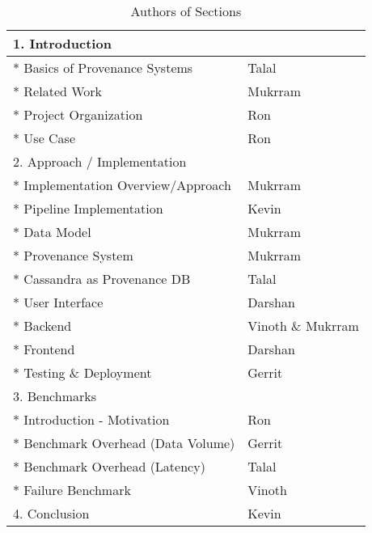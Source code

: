 \begin{table}
\begin{center}
 \begin{tabular}{| m{18em} m{10em} |} 
 \hline
1. Introduction                                                   &                    \\
 \hline
* Basics of Provenance Systems                                    &     Talal               \\
 \hline
* Related Work                                                    &          Mukrram          \\
 \hline
* Project Organization                                            &         Ron           \\
 \hline
* Use Case                                                        &   Ron                 \\
 \hline
2. Approach / Implementation                                      &                    \\
 \hline
* Implementation Overview/Approach                                &    Mukrram                \\
 \hline
* Pipeline Implementation                                         &      Kevin              \\
 \hline
* Data Model                                                      &        Mukrram            \\
 \hline
* Provenance System                                                     &         Mukrram           \\
 \hline
* Cassandra as Provenance DB                                      &       Talal             \\
 \hline
* User Interface                                                  &           Darshan         \\
 \hline
* Backend                                                         &         Vinoth \& Mukrram           \\
 \hline
* Frontend                                                        &    Darshan                \\
 \hline
* Testing \& Deployment  &  Gerrit         \\
 \hline
3. Benchmarks                                                     &                    \\
 \hline
* Introduction - Motivation                                             & Ron \\
 \hline
* Benchmark Overhead (Data Volume)      & Gerrit \\  
 \hline
* Benchmark Overhead (Latency)      & Talal \\  
 \hline
* Failure Benchmark                                             &       Vinoth     \\
 \hline
4. Conclusion                                                     &     Kevin               \\
 \hline
\end{tabular}
\end{center}
\caption{Authors of Sections}
\label{table:authors}
\end{table}


